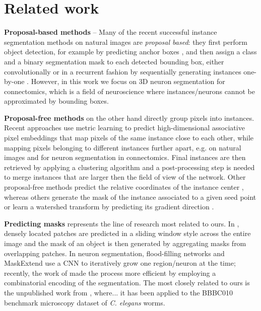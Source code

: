 
\section{Related work} \label{sec:related_work}
\textbf{Proposal-based methods} -- Many of the recent successful instance segmentation methods on natural images are \emph{proposal based}: they first perform object detection, for example by predicting anchor boxes \cite{ren2015faster}, and then assign a class and a binary segmentation mask to each detected bounding box, either convolutionally \cite{he2017mask,porzi2019seamless,liu2018path,yang2012layered,li2017fully,ladicky2010and,hariharan2014simultaneous,chen2015multi,dai2016instance,liang2016reversible} or in a recurrent fashion by sequentially generating instances one-by-one \cite{romera2016recurrent,ren2017end}. 
However, in this work we focus on 3D neuron segmentation for connectomics, which is a field of neuroscience where instances/neurons cannot be approximated by bounding boxes. 

\textbf{Proposal-free methods} on the other hand directly group pixels into instances. 
Recent approaches use metric learning to predict high-dimensional associative pixel embeddings that map pixels of the same instance close to each other, while mapping pixels belonging to different instances further apart, e.g. \cite{kong2018recurrentPix,fathi2017semantic,newell2017associative,de2017semantic} on natural images and \cite{lee2019learning} for neuron segmentation in connectomics. %
Final instances are then retrieved by applying a clustering algorithm and a post-processing step is needed to merge instances that are larger then the field of view of the network. 
Other proposal-free methods predict the relative coordinates of the instance center \cite{neven2019instance,cheng2019panopticdeeplab}, whereas others generate the mask of the instance associated to a given seed point \cite{sofiiuk2019adaptis} or  
learn a watershed transform by predicting its gradient direction \cite{bai2017deep}. 

\textbf{Predicting \maskname masks} represents the line of research most related to ours. 
In \cite{liu2016multi}, densely located patches are predicted in a sliding window style across the entire image and the mask of an object is then generated by aggregating masks from overlapping patches.
In neuron segmentation, flood-filling networks \cite{januszewski2018high} and MaskExtend \cite{meirovitch2016multi} use a CNN to iteratively grow one region/neuron at the time; recently, the work of \cite{meirovitch2019cross} made the process more efficient by employing a combinatorial encoding of the segmentation.
The most closely related to ours is the unpublished work from \cite{hirsch2020patchperpix}, where... it has been applied to the BBBC010 benchmark microscopy dataset of \emph{C. elegans} worms.


